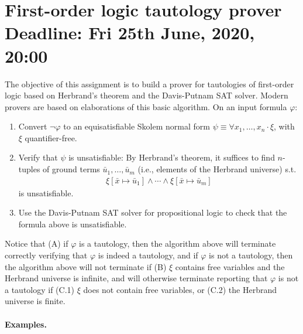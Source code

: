 \documentclass[zad,zawodnik,en]{sinol}
\begin{document}
  \section*{\Huge{First-order logic tautology prover} \\ \small{Deadline: Fri 25th June, 2020, 20:00}}
    \noindent
    The objective of this assignment is to build a prover for tautologies of first-order logic based on Herbrand's theorem and the Davis-Putnam SAT solver.
    Modern provers are based on elaborations of this basic algorithm.
    On an input formula $\varphi$:
    \begin{enumerate}
      \item Convert $\neg \varphi$ to an equisatisfiable Skolem normal form $\psi \equiv \forall x_1, \dots, x_n \cdot \xi$, with $\xi$ quantifier-free.
      \item Verify that $\psi$ is unsatisfiable:
      By Herbrand's theorem, it suffices to find $n$-tuples of ground terms $\bar u_1, \dots, \bar u_m$ (i.e., elements of the Herbrand universe) s.t.
      \begin{align*}
        \xi[\bar x \mapsto \bar u_1] \land \cdots \land \xi[\bar x \mapsto \bar u_m]
      \end{align*}
      is unsatisfiable.

      \item Use the Davis-Putnam SAT solver for propositional logic to check that the formula above is unsatisfiable.
    \end{enumerate}
    Notice that (A) if $\varphi$ is a tautology, then the algorithm above will terminate correctly verifying that $\varphi$ is indeed a tautology,
    and if $\varphi$ is not a tautology,
    then the algorithm above
    will not terminate if (B) $\xi$ contains free variables and the Herbrand universe is infinite,
    and will otherwise terminate reporting that $\varphi$ is not a tautology if
    (C.1) $\xi$ does not contain free variables,
    or (C.2) the Herbrand universe is finite.
    
    \paragraph{Examples.}
\end{document}
